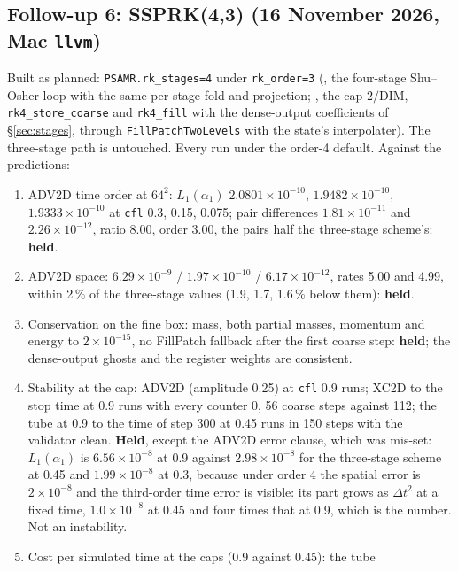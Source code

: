 \documentclass[11pt,a4paper]{article}
\newcommand{\code}[1]{\texttt{\small #1}}
\newcommand{\Dt}{\Delta t}
\begin{document}
\subsection{Follow-up 6: SSPRK(4,3) (16 November 2026, Mac \code{llvm})}
\label{sec:fu6}

Built as planned: \code{PSAMR.rk\_stages=4} under \code{rk\_order=3}
(, the four-stage Shu--Osher loop with the same
per-stage fold and projection; , the cap $2/\mathrm{DIM}$,
\code{rk4\_store\_coarse} and \code{rk4\_fill} with the dense-output
coefficients of \S\ref{sec:stages}, through \code{FillPatchTwoLevels}
with the state's interpolater).  The three-stage path is untouched.
Every run under the order-4 default.  Against the predictions:
\begin{enumerate}[nosep]
\item ADV2D time order at $64^2$: $L_1(\alpha_1)$ $2.0801\times10^{-10}$,
      $1.9482\times10^{-10}$, $1.9333\times10^{-10}$ at \code{cfl} 0.3,
      0.15, 0.075; pair differences $1.81\times10^{-11}$ and
      $2.26\times10^{-12}$, ratio 8.00, order 3.00, the pairs half the
      three-stage scheme's: \textbf{held}.
\item ADV2D space: $6.29\times10^{-9}$ / $1.97\times10^{-10}$ /
      $6.17\times10^{-12}$, rates 5.00 and 4.99, within 2\,\% of the
      three-stage values (1.9, 1.7, 1.6\,\% below them): \textbf{held}.
\item Conservation on the fine box: mass, both partial masses, momentum
      and energy to $2\times10^{-15}$, no FillPatch fallback after the
      first coarse step: \textbf{held}; the dense-output ghosts and the
      register weights are consistent.
\item Stability at the cap: ADV2D (amplitude 0.25) at \code{cfl} 0.9
      runs; XC2D to the stop time at 0.9 runs with every counter 0,
      56 coarse steps against 112; the tube at 0.9 to the time of step
      300 at 0.45 runs in 150 steps with the validator clean.
      \textbf{Held}, except the ADV2D error clause, which was mis-set:
      $L_1(\alpha_1)$ is $6.56\times10^{-8}$ at 0.9 against
      $2.98\times10^{-8}$ for the three-stage scheme at 0.45 and
      $1.99\times10^{-8}$ at 0.3, because under order 4 the spatial
      error is $2\times10^{-8}$ and the third-order time error is
      visible: its part grows as $\Dt^2$ at a fixed time, $1.0\times10^{-8}$
      at 0.45 and four times that at 0.9, which is the number.  Not an
      instability.
\item Cost per simulated time at the caps (0.9 against 0.45): the tube

\end{enumerate}
\end{document}
